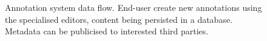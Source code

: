 \begin{figure}[!ht]
  \centering
  \caption[Annotation system data flow]
          {Annotation system data flow. End-user create new annotations using
           the specialised editors, content being persisted in a database.
           Metadata can be publicised to interested third parties.}
  \label{fig:dataflow}
\end{figure}
